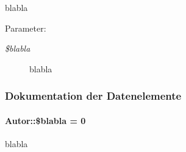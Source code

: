 blabla 

\begin{Desc}
\item[Parameter:]
\begin{description}
\item[{\em \$blabla}]blabla \end{description}
\end{Desc}


\subsubsection{Dokumentation der Datenelemente}
\hypertarget{classAutor_2dc163422acc9a6161ae97d2301ddba0}{
\paragraph[\$blabla]{\setlength{\rightskip}{0pt plus 5cm}Autor::\$blabla = 0}\hfill}
\label{classAutor_2dc163422acc9a6161ae97d2301ddba0}


blabla 

